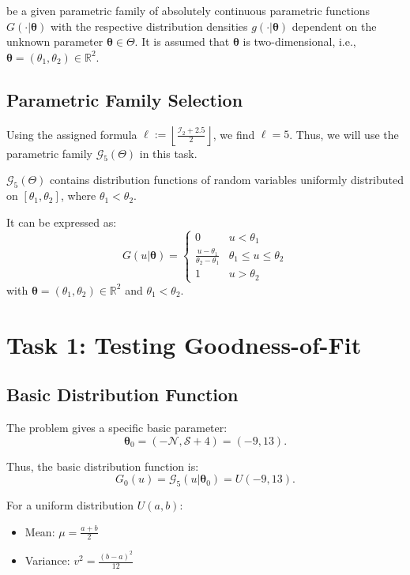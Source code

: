 \documentclass{article}
\begin{document}
be a given parametric family of absolutely continuous parametric functions \(G(\cdot|\boldsymbol{\theta})\) with the respective distribution densities \(g(\cdot|\boldsymbol{\theta})\) dependent on the unknown parameter \(\boldsymbol{\theta} \in \Theta\). It is assumed that \(\boldsymbol{\theta}\) is two-dimensional, i.e., \(\boldsymbol{\theta} = (\theta_1, \theta_2) \in \mathbb{R}^2\).

\subsection{Parametric Family Selection}

Using the assigned formula \( \ell := \left\lfloor \frac{\mathcal{I}_2 + 2.5}{2} \right\rfloor \), we find \( \ell = 5 \). Thus, we will use the parametric family \(\mathcal{G}_5(\Theta)\) in this task.

$\mathcal{G}_5(\Theta)$ contains distribution functions of random variables uniformly distributed on $[\theta_1, \theta_2]$, where $\theta_1 < \theta_2$.

It can be expressed as:
\[
G(u|\boldsymbol\theta) = \begin{cases}
0 & u < \theta_1 \\
\frac{u - \theta_1}{\theta_2 - \theta_1} & \theta_1 \le u \le \theta_2 \\
1 & u > \theta_2
\end{cases}
\]
with \(\boldsymbol\theta = (\theta_1, \theta_2) \in \mathbb{R}^2\) and \(\theta_1 < \theta_2\).

\section{Task 1: Testing Goodness-of-Fit}

\subsection{Basic Distribution Function}

The problem gives a specific basic parameter:
\[
\boldsymbol\theta_0 = (-\mathcal{N}, \mathcal{S} + 4) = (-9, 13).
\]

Thus, the basic distribution function is:
\[
G_0(u) = \mathcal{G}_5(u|\boldsymbol\theta_0) = U(-9, 13).
\]

For a uniform distribution \(U(a,b)\):

\begin{itemize}
    \item Mean: \(\mu = \frac{a+b}{2}\)
    \item Variance: \(v^2 = \frac{(b-a)^2}{12}\)
\end{itemize}
\end{document}
